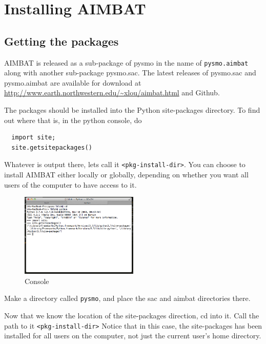 \documentclass[letterpaper,10pt]{article}
\begin{document}
\section{Installing AIMBAT}


\subsection{Getting the packages}

AIMBAT is released as a sub-package of pysmo in the name of \verb"pysmo.aimbat" along with
another sub-package pysmo.sac. The latest releases of pysmo.sac and pysmo.aimbat are
available for download at \url{http://www.earth.northwestern.edu/~xlou/aimbat.html} and Github. 

The packages should be installed into the Python site-packages directory. To find out where that is, in the python console, do

\begin{verbatim}
  import site;
  site.getsitepackages()
\end{verbatim}

Whatever is output there, lets call it \verb"<pkg-install-dir>". You can choose to install AIMBAT either locally or globally, depending on whether you want all users of the computer to have access to it.

\begin{figure}[h!]
  \centering
  \includegraphics[width=0.5\textwidth]{images/site_package_location}
  \caption{Console}
  \label{fig:site_package_location}
\end{figure}

Make a directory called \verb"pysmo", and place the sac and aimbat directories there. 

Now that we know the location of the site-packages direction, cd into it. Call the path to it \verb"<pkg-install-dir>" Notice that in this case, the site-packages has been installed for all users on the computer, not just the current user's home directory. 
\end{document}
